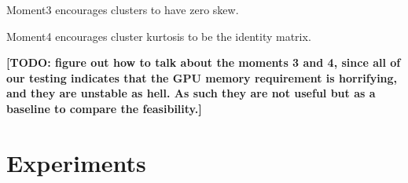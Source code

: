 \documentclass[10pt,twocolumn,letterpaper]{article}
\newcommand{\TODO}[1]{\textbf{\color{red}[TODO: #1]}}
\begin{document}
Moment3 encourages clusters to have zero skew. 

Moment4 encourages cluster kurtosis to be the identity matrix. 

\TODO {figure out how to talk about the moments 3 and 4, since all of our testing indicates that the GPU memory requirement is horrifying, and they are unstable as hell. As such they are not useful but as a baseline to compare the feasibility.}





\section{Experiments}
\end{document}
